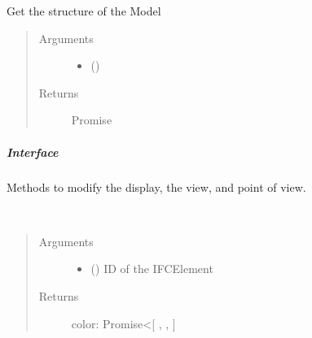 \documentclass[a4paper,12pt,english]{sphinxmanual}
\begin{document}
\begin{fulllineitems}
\label{\detokenize{viewer/parameters:BIMDataViewer.getStructure}}
Get the structure of the Model
\begin{quote}\begin{description}
\item[{Arguments}] \leavevmode\begin{itemize}
\item {} 
 () \textendash{} 

\end{itemize}

\item[{Returns}] \leavevmode
Promise 

\end{description}\end{quote}

\end{fulllineitems}



\subparagraph{Interface}
\label{\detokenize{viewer/parameters:interface}}
Methods to modify the display, the view, and point of view.


\begin{fulllineitems}
\label{\detokenize{viewer/parameters:BIMDataViewer.getColor}}~\begin{quote}\begin{description}
\item[{Arguments}] \leavevmode\begin{itemize}
\item {} 
 () \textendash{} ID of the IFCElement

\end{itemize}

\item[{Returns}] \leavevmode
color: Promise\textless{}{[} , ,  {]}

\end{description}\end{quote}

\end{fulllineitems}
\end{document}
